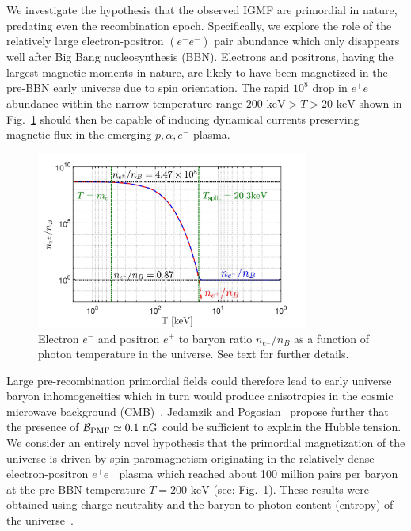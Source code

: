\documentclass[a4paper]{article}
\newcommand*{\keV}{\text{ keV}}
\newcommand{\rf}[1]{Fig.~{\ref{#1}}}
\newcommand*{\xblue}{\color{black}}
\begin{document}
We investigate the hypothesis that the observed  IGMF  are primordial in nature, predating even the recombination epoch. Specifically, we explore the role of the relatively large electron-positron $(e^{+}e^{-})$ pair abundance which only disappears well after Big Bang nucleosynthesis (BBN). {\xblue Electrons and positrons, having the largest magnetic moments in nature, are likely to have been magnetized in the pre-BBN early universe due to spin orientation. The rapid $10^{8}$ drop in $e^{+}e^{-}$ abundance within the narrow temperature range $200\keV>T>20\keV$ shown in \rf{fig:densityratio} should then be capable of inducing dynamical currents preserving magnetic flux} in the emerging $p,\alpha,e^-$ plasma.  
\begin{figure}[h]
    \centering
    \includegraphics[width=0.8\textwidth]{plots/EEPlasmaDensityRatio_new.jpg}
    \caption{Electron $e^-$ and positron $e^+$ to baryon ratio $n_{e^{\pm}}/n_{B}$  as a function of photon temperature in the universe. See text for further details.}
    \label{fig:densityratio} 
\end{figure}

Large pre-recombination primordial fields could therefore lead to early universe baryon inhomogeneities which in turn would produce anisotropies in the cosmic microwave background (CMB)~\cite{jedamzik2013smallscale,abdalla2022cosmology}. Jedamzik and Pogosian~\cite{jedamzik2020relieving} propose further that the presence of ${\cal B}_{\rm PMF}\simeq0.1{\rm\ nG}$ could be sufficient to explain the Hubble tension. {\xblue We consider an entirely novel hypothesis that the primordial magnetization of the universe is driven by spin paramagnetism originating in the relatively dense electron-positron $e^{+}e^{-}$ plasma which reached about 100 million pairs per baryon at the pre-BBN temperature $T=200\keV$ (see: \rf{fig:densityratio}). These results were obtained using charge neutrality and the baryon to photon content (entropy) of the universe~\cite{rafelski2023short}.} 
\end{document}
